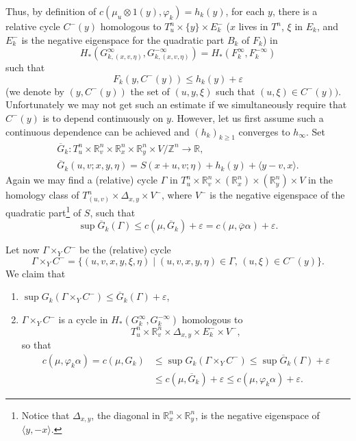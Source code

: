 \documentclass[JEP,XML,SOM,NoFloatCountersInSection,Unicode,published]{cedram}
\numberwithin{equation}{section}
\let \phi \varphi
\theoremstyle{plain}
\theoremstyle{definition}
\theoremstyle{remark}
\begin{document}
Thus, by definition of $c(\mu_{u}\otimes 1(y),\varphi_{k})=h_{k}(y)$, for each $y$, there is a relative cycle
$C^-(y)$ homologous to $T_u^{n} \times \{y\}\times E^{-}_{k}$ ($x$ lives in $T^{n}$, $\xi$ in $E_{k}$, and $E_{k}^{-}$
is the negative eigenspace for the quadratic part $B_{k}$ of $F_{k}$) in
\[
H_{*}(G_{k,(x,v,\eta)}^{\infty},G_{k,(x,v,\eta)}^{-\infty})= H_{*}(F_{k}^{\infty},F_{k}^{-\infty})
\]
such that
\[
{F}_{k} (y, C^-(y))\leq {h}_{k}(y) +\varepsilon
\]
(we denote by $(y, C^-(y))$ the set of $(u,y,\xi)$ such that $(u,\xi)\in
C^-(y))$. Unfortunately we may not get such an estimate if we simultaneously require that $C^-(y)$ is to depend continuously on $y$. However, let us first assume such a continuous dependence can be achieved and $(h_{k})_{k\geq 1}$ converges to $h_{\infty}$.
Set
\begin{gather*}
{\overline G}_k: T^{n}_{u}\times {\mathbb R}_{v}^{n} \times \mathbb{R}^{n}_{x} \times
\mathbb{R}^{n}_{y} \times V / \mathbb Z^n\to\mathbb{R},\\
{\overline G}_{k} (u,v ; x, y, \eta) =
S (x+u,v;\eta) + {h}_{k}(y) + \langle y-v, x\rangle.
\end{gather*}
Again we may find a (relative) cycle $\Gamma$ in $T^{n}_{u}\times {\mathbb R}_{v}^{n} \times (\mathbb{R}_{x}^{n})\times
(\mathbb{R}_{y}^{n}) \times V$ in the homology
class of $T^{n}_{(u,v)}\times \Delta_{x,y} \times V^{-}$, where $V^{-}$ is the negative eigenspace of the quadratic
part\footnote{ Notice that $\Delta_{x,y}$, the diagonal in $\mathbb{R}^{n}_{x}
\times \mathbb{R}^{n}_{y}$, is the negative eigenspace of
$\langle y, - x\rangle$.} of $S$, such that
\[
\sup \overline G_{k}(\Gamma) \leq c (\mu, \overline G_k) + \varepsilon = c (\mu, \overline\varphi\alpha) + \varepsilon.
\]

Let now $\Gamma \times_{Y} C^-$ be the (relative) cycle
\[
\Gamma \times_{Y} C^-=\bigl\{ (u,v,x,y,\xi,\eta) \mid (u,v, x, y, \eta)\in \Gamma,\,(u,\xi) \in C^-(y)\bigr\}.
\]
We claim that

\begin{enumerate}
\item \label{1i}
$\sup
G_{k} (\Gamma \times_{Y} C^-) \leq \overline G_{k} (\Gamma) + \varepsilon$,
\item \label{2i} $\Gamma \times_{Y}C^-$ is a cycle in $H_{*}(G_{k}^{\infty},G_{k}^{-\infty})$ homologous to
\[
T^{n}_{u}\times {\mathbb R}_{v}^{n}\times \Delta_{x,y} \times E^{-}_{k} \times V^{-},
\]
so that
\begin{align*}
c(\mu, \phi_{k}\alpha)=c(\mu, G_{k}) &\leq \sup G_k(\Gamma \times_YC^-)\leq \sup \overline G_{k} (\Gamma)+ \varepsilon\\
&\leq c(\mu,\overline G_{k})+ \varepsilon \leq c(\mu,
\varphi_{k} \alpha)+ \varepsilon.
\end{align*}
\end{enumerate}
\end{document}
